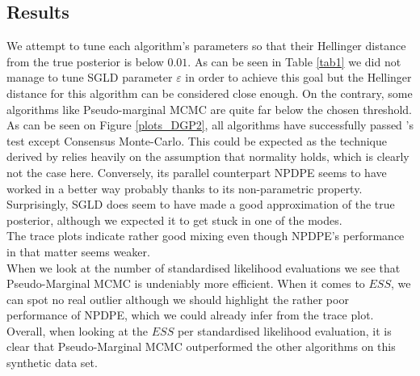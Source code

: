 \documentclass[11pt,a4paper]{report}\usepackage[]{graphicx}\usepackage[]{color}
\begin{document}
\subsection{Results}
We attempt to tune each algorithm's parameters so that their Hellinger distance from the true posterior is below $0.01$. As can be seen in Table \ref{tab1} we did not manage to tune SGLD parameter $\varepsilon$ in order to achieve this goal but the Hellinger distance for this algorithm can be considered close enough. On the contrary, some algorithms like Pseudo-marginal MCMC are quite far below the chosen threshold.\\
As can be seen on Figure \ref{plots_DGP2}, all algorithms have successfully passed \cite{geweke2004getting}'s test except Consensus Monte-Carlo. This could be expected as the technique derived by \cite{scott2016bayes} relies heavily on the assumption that normality holds, which is clearly not the case here. Conversely, its parallel counterpart NPDPE seems to have worked in a better way probably thanks to its non-parametric property. 
Surprisingly, SGLD does seem to have made a good approximation of the true posterior, although we expected it to get stuck in one of the modes.\\
The trace plots indicate rather good mixing even though NPDPE's performance in that matter seems weaker.\\
When we look at the number of standardised likelihood evaluations we see that Pseudo-Marginal MCMC is undeniably more efficient. When it comes to $ESS$, we can spot no real outlier although we should highlight the rather poor performance of NPDPE, which we could already infer from the trace plot.\\
Overall, when looking at the $ESS$ per standardised likelihood evaluation, it is clear that Pseudo-Marginal MCMC outperformed the other algorithms on this synthetic data set.
\end{document}
